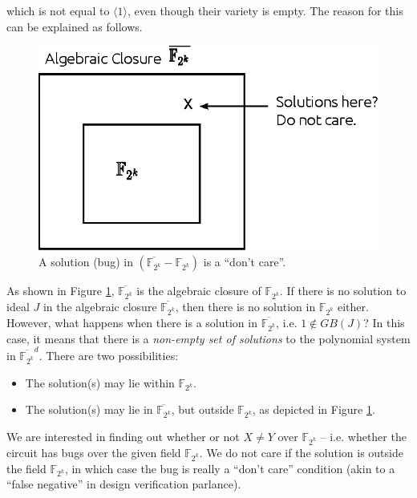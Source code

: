 which is not equal to $\langle 1\rangle$, even though their variety is
empty. The reason for this can be explained as follows. 

\begin{figure}[htb]
\centerline{
\includegraphics[scale=1]{./figures/closure.eps}
}
\caption{ A solution (bug) in
  $(\overline{\mathbb{F}_{2^{k}}}-\mathbb{F}_{2^k})$ is a ``don't
  care''.} 
\label{fig:closure}
\end{figure}

As shown in Figure \ref{fig:closure}, $\overline{ \mathbb{F}_{2^k} }$
is the algebraic closure of $\mathbb{F}_{2^k}$.
If there is no solution to ideal $J$ in the algebraic closure
$\overline{ \mathbb{F}_{2^k}}$,  then there is no solution in
$\mathbb{F}_{2^k}$ either. However, what happens when there is a
solution in $\overline{ \mathbb{F}_{2^k}}$, i.e. $1 \notin GB(J)$?  
In this case, it means that there is a {\it non-empty set of
  solutions} to the polynomial system in
$\overline{\mathbb{F}_{2^k}}^d$. There are two possibilities:  
\begin{itemize}
	\item The solution(s) may lie within $\mathbb{F}_{2^k}$.
	\item The solution(s) may lie in $\overline
          {\mathbb{F}_{2^k}}$, but outside $\mathbb{F}_{2^k}$, as
          depicted in  Figure \ref{fig:closure}. 
\end{itemize}
We are interested in finding out whether or not $X \neq Y$ over $\mathbb{F}_{2^{k}}$ 
-- i.e. whether the circuit has bugs over the given field
$\mathbb{F}_{2^{k}}$. We do not care if the solution is outside the
field $\mathbb{F}_{2^{k}}$, in which case the bug is really a ``don't
care'' condition (akin to a ``false negative'' in design verification
parlance).  


